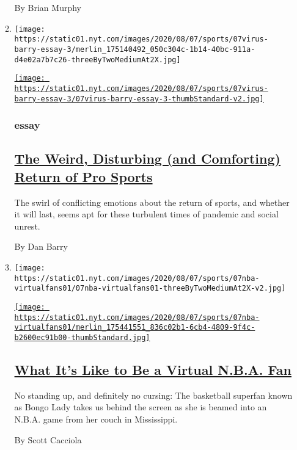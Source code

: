 \begin{enumerate}
\begin{enumerate}
    By Brian Murphy
  \item
    \texttt{[image: https://static01.nyt.com/images/2020/08/07/sports/07virus-barry-essay-3/merlin\_175140492\_050c304c-1b14-40bc-911a-d4e02a7b7c26-threeByTwoMediumAt2X.jpg]}

    \href{/2020/08/07/sports/coronavirus-restart-nba-baseball.html}{\texttt{[image: https://static01.nyt.com/images/2020/08/07/sports/07virus-barry-essay-3/07virus-barry-essay-3-thumbStandard-v2.jpg]}}

    \hypertarget{essay}{%
    \subsubsection{essay}\label{essay}}

    \hypertarget{the-weird-disturbing-and-comforting-return-of-pro-sports}{%
    \subsection{\texorpdfstring{\href{/2020/08/07/sports/coronavirus-restart-nba-baseball.html}{The
    Weird, Disturbing (and Comforting) Return of Pro
    Sports}}{The Weird, Disturbing (and Comforting) Return of Pro Sports}}\label{the-weird-disturbing-and-comforting-return-of-pro-sports}}

    The swirl of conflicting emotions about the return of sports, and
    whether it will last, seems apt for these turbulent times of
    pandemic and social unrest.

    By Dan Barry
  \item
    \texttt{[image: https://static01.nyt.com/images/2020/08/07/sports/07nba-virtualfans01/07nba-virtualfans01-threeByTwoMediumAt2X-v2.jpg]}

    \href{/2020/08/07/sports/basketball/nba-virtual-fans.html}{\texttt{[image: https://static01.nyt.com/images/2020/08/07/sports/07nba-virtualfans01/merlin\_175441551\_836c02b1-6cb4-4809-9f4c-b2600ec91b00-thumbStandard.jpg]}}

    \hypertarget{what-its-like-to-be-a-virtual-nba-fan}{%
    \subsection{\texorpdfstring{\href{/2020/08/07/sports/basketball/nba-virtual-fans.html}{What
    It's Like to Be a Virtual N.B.A.
    Fan}}{What It's Like to Be a Virtual N.B.A. Fan}}\label{what-its-like-to-be-a-virtual-nba-fan}}

    No standing up, and definitely no cursing: The basketball superfan
    known as Bongo Lady takes us behind the screen as she is beamed into
    an N.B.A. game from her couch in Mississippi.

    By Scott Cacciola
  \end{enumerate}
\end{enumerate}

